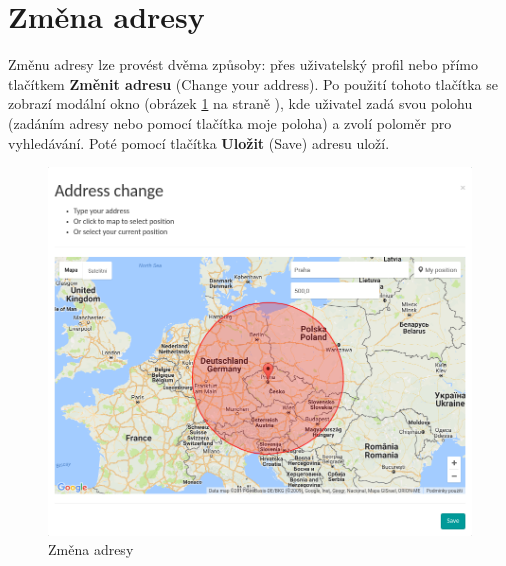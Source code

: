 \section{Změna adresy}

\label{nur:address-change}

Změnu adresy lze provést dvěma způsoby: přes uživatelský profil nebo přímo tlačítkem \textbf{Změnit adresu} (Change your address). Po použití tohoto tlačítka se zobrazí modální okno (obrázek \ref{fig:tur:address-change} na straně \pageref{fig:tur:address-change}), kde uživatel zadá svou polohu (zadáním adresy nebo pomocí tlačítka moje poloha) a zvolí poloměr pro vyhledávání. Poté pomocí tlačítka \textbf{Uložit} (Save) adresu uloží.

\begin{figure}[!h]
    \centering
    \includegraphics[width=1.0\textwidth]{media/tur/address-change.png}
    \caption{Změna adresy}
    \label{fig:tur:address-change}
\end{figure}